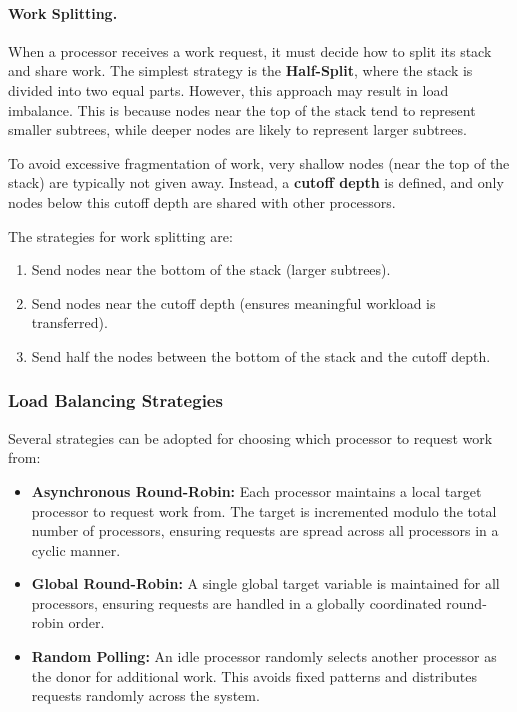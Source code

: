 \documentclass[12pt]{book}
\begin{document}
\paragraph{Work Splitting.}  
When a processor receives a work request, it must decide how to split its stack and share work. The simplest strategy is the \textbf{Half-Split}, where the stack is divided into two equal parts. However, this approach may result in load imbalance. This is because nodes near the top of the stack tend to represent smaller subtrees, while deeper nodes are likely to represent larger subtrees.  

To avoid excessive fragmentation of work, very shallow nodes (near the top of the stack) are typically not given away. Instead, a \textbf{cutoff depth} is defined, and only nodes below this cutoff depth are shared with other processors.  

The strategies for work splitting are:
\begin{enumerate}
    \item Send nodes near the bottom of the stack (larger subtrees).  
    \item Send nodes near the cutoff depth (ensures meaningful workload is transferred).  
    \item Send half the nodes between the bottom of the stack and the cutoff depth.  
\end{enumerate}

\subsubsection{Load Balancing Strategies}
Several strategies can be adopted for choosing which processor to request work from:
\begin{itemize}
    \item \textbf{Asynchronous Round-Robin:} Each processor maintains a local target processor to request work from. The target is incremented modulo the total number of processors, ensuring requests are spread across all processors in a cyclic manner.  
    \item \textbf{Global Round-Robin:} A single global target variable is maintained for all processors, ensuring requests are handled in a globally coordinated round-robin order.  
    \item \textbf{Random Polling:} An idle processor randomly selects another processor as the donor for additional work. This avoids fixed patterns and distributes requests randomly across the system.  
\end{itemize}
\end{document}
